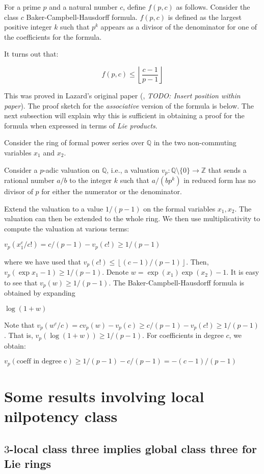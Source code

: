\documentclass{ucetd}
\begin{document}
For a prime $p$ and a natural number $c$, define $f(p,c)$ as
follows. Consider the class $c$ Baker-Campbell-Hausdorff
formula. $f(p,c)$ is defined as the largest positive integer $k$ such
that $p^k$ appears as a divisor of the denominator for one of the
coefficients for the formula.

It turns out that:

$$f(p,c) \le \left \lfloor \frac{c - 1}{p - 1} \right \rfloor$$

This was proved in Lazard's original paper (\cite{Lazardsoriginal},
{\em TODO: Insert position within paper}). The proof sketch for the
{\em associative} version of the formula is below. The next subsection
will explain why this is sufficient in obtaining a proof for the
formula when expressed in terms of {\em Lie products}.

Consider the ring of formal power series over $\mathbb{Q}$ in the two non-commuting variables $x_1$ and $x_2$.

Consider a $p$-adic valuation on $\mathbb{Q}$, i.e., a valuation $v_p: \mathbb{Q} \setminus \{ 0 \} \to \mathbb{Z}$ that sends a rational number $a/b$ to the integer $k$ such that $a/(bp^k)$ in reduced form has no divisor of $p$ for either the numerator or the denominator.

Extend the valuation to a value $1/(p-1)$ on the formal variables $x_1,x_2$. The valuation can then be extended to the whole ring. We then use multiplicativity to compute the valuation at various terms:

$\! v_p(x_1^c/c!)=c/(p-1) - v_p(c!) \geq 1/(p-1)$

where we have used that $v_p(c!) \leq
\left \lfloor(c-1)/(p-1)\right\rfloor$. Then, $v_p(\exp x_1 - 1)\geq
1/(p-1)$. Denote $w = \exp(x_1)\exp(x_2) - 1$. It is easy to see that
$v_p(w) \geq 1/(p-1)$. The Baker-Campbell-Hausdorff formula is
obtained by expanding

$\! \log(1 + w)$

Note that $v_p(w^c/c)=cv_p(w)-v_p(c)\geq c/(p-1) - v_p(c!) \geq
1/(p-1)$. That is, $v_p(\log(1 + w))\geq 1/(p-1)$. For coefficients in
degree $c$, we obtain:

$v_p(\mbox{coeff in degree c}) \geq 1/(p-1) - c/(p-1)=-(c-1)/(p-1)$

\section{Some results involving local nilpotency class}

\subsection{$3$-local class three implies global class three for Lie rings}\label{appsec:3-local-class-three-implies-global-class-three}
\end{document}
